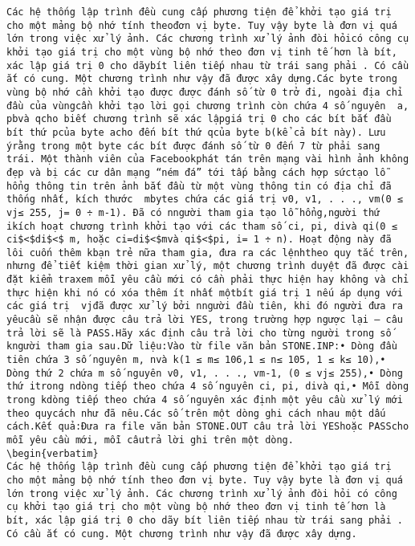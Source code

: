 
\begin{verbatim}
Các hệ thống lập trình đều cung cấp phương tiện để khởi tạo giá trị cho một mảng bộ nhớ tính theođơn vị byte. Tuy vậy byte là đơn vị quá lớn trong việc xử lý ảnh. Các chương trình xử lý ảnh đòi hỏicó công cụ khởi tạo giá trị cho một vùng bộ nhớ theo đơn vị tinh tế hơn là bít, xác lập giá trị 0 cho dãybít liên tiếp nhau từ trái sang phải . Có cầu ắt có cung. Một chương trình như vậy đã được xây dựng.Các byte trong vùng bộ nhớ cần khởi tạo được được đánh số từ 0 trở đi, ngoài địa chỉ đầu của vùngcần khởi tạo lời gọi chương trình còn chứa 4 số nguyên  a, pbvà qcho biết chương trình sẽ xác lậpgiá trị 0 cho các bít bắt đầu bít thứ pcủa byte acho đến bít thứ qcủa byte b(kể cả bít này). Lưu ýrằng trong một byte các bít được đánh số từ 0 đến 7 từ phải sang trái. Một thành viên của Facebookphát tán trên mạng vài hình ảnh không đẹp và bị các cư dân mạng “ném đá” tới tấp bằng cách hợp sứctạo lỗ hổng thông tin trên ảnh bắt đầu từ một vùng thông tin có địa chỉ đã thống nhất, kích thước  mbytes chứa các giá trị v0, v1, . . ., vm(0 ≤ vj≤ 255, j= 0 ÷ m-1). Đã có nngười tham gia tạo lỗ hổng,người thứ ikích hoạt chương trình khởi tạo với các tham số ci, pi, divà qi(0 ≤ ci$<$di$<$ m, hoặc ci=di$<$mvà qi$<$pi, i= 1 ÷ n). Hoạt động này đã lôi cuốn thêm kbạn trẻ nữa tham gia, đưa ra các lệnhtheo quy tắc trên, nhưng để tiết kiệm thời gian xử lý, một chương trình duyệt đã được cài đặt kiểm traxem mỗi yêu cầu mới có cần phải thực hiện hay không và chỉ thực hiện khi nó có xóa thêm ít nhất mộtbít giá trị 1 nếu áp dụng với các giá trị  vjđã được xử lý bởi nngười đầu tiên, khi đó người đưa ra yêucầu sẽ nhận được câu trả lời YES, trong trường hợp ngược lại – câu trả lời sẽ là PASS.Hãy xác định câu trả lời cho từng người trong số kngười tham gia sau.Dữ liệu:Vào từ file văn bản STONE.INP:• Dòng đầu tiên chứa 3 số nguyên m, nvà k(1 ≤ m≤ 106,1 ≤ n≤ 105, 1 ≤ k≤ 10),• Dòng thứ 2 chứa m số nguyên v0, v1, . . ., vm-1, (0 ≤ vj≤ 255),• Dòng thứ itrong ndòng tiếp theo chứa 4 số nguyên ci, pi, divà qi,• Mỗi dòng trong kdòng tiếp theo chứa 4 số nguyên xác định một yêu cầu xử lý mới theo quycách như đã nêu.Các số trên một dòng ghi cách nhau một dấu cách.Kết quả:Đưa ra file văn bản STONE.OUT câu trả lời YEShoặc PASScho mỗi yêu cầu mới, mỗi câutrả lời ghi trên một dòng.
\begin{verbatim}
Các hệ thống lập trình đều cung cấp phương tiện để khởi tạo giá trị cho một mảng bộ nhớ tính theo đơn vị byte. Tuy vậy byte là đơn vị quá lớn trong việc xử lý ảnh. Các chương trình xử lý ảnh đòi hỏi có công cụ khởi tạo giá trị cho một vùng bộ nhớ theo đơn vị tinh tế hơn là bít, xác lập giá trị 0 cho dãy bít liên tiếp nhau từ trái sang phải . Có cầu ắt có cung. Một chương trình như vậy đã được xây dựng.\end{verbatim}
